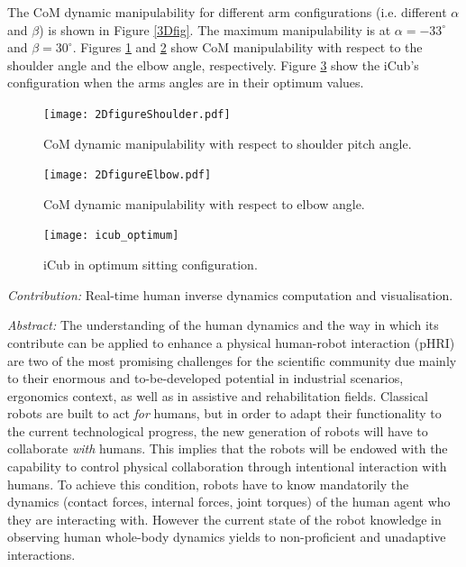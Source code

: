 The CoM dynamic manipulability for different arm configurations
(i.e. different $\alpha$ and $\beta$) is shown in Figure \ref{3Dfig}.  The
maximum manipulability is at $\alpha = -33^\circ$ and $\beta = 30^\circ$.
Figures \ref{2Dfig_shoulder} and \ref{2Dfig_elbow} show CoM manipulability
with respect to the shoulder angle and the elbow angle, respectively.  Figure
\ref{icub_optimum} show the iCub's configuration when the arms angles are in
their optimum values.
%
\begin{figure}
  \centering \texttt{[image: 2DfigureShoulder.pdf]}
  \caption{CoM dynamic manipulability with respect to shoulder pitch angle.}
  \label{2Dfig_shoulder}
\end{figure}
%
\begin{figure}
  \centering
  \texttt{[image: 2DfigureElbow.pdf]}
  \caption{CoM dynamic manipulability with respect to elbow angle.}
  \label{2Dfig_elbow}
\end{figure}
%
\begin{figure}
  \centering \texttt{[image: icub\_optimum]}
  \caption{iCub in optimum sitting configuration.}
  \label{icub_optimum}
\end{figure}

\emph{Contribution:} Real-time human inverse dynamics computation and visualisation.

\emph{Abstract:} The understanding of the human dynamics and the way in which its contribute can 
be applied to enhance a physical human-robot interaction (pHRI) are two of the 
most promising challenges for the scientific community due mainly to their 
enormous and to-be-developed potential in industrial scenarios, ergonomics 
context, as well as in assistive and rehabilitation fields. 
Classical robots are built to act \emph{for} humans, but in order to adapt 
their functionality to the current technological progress, the new generation 
of robots will have to collaborate \emph{with} humans.  This implies that the 
robots will be endowed with the capability to control physical collaboration 
through intentional interaction with humans.
To achieve this condition, robots have to know mandatorily the dynamics 
(contact forces, internal forces, joint torques) of the human agent who 
they are interacting with.  However the current state of the robot knowledge 
in observing human whole-body dynamics  yields to non-proficient and unadaptive 
interactions.


